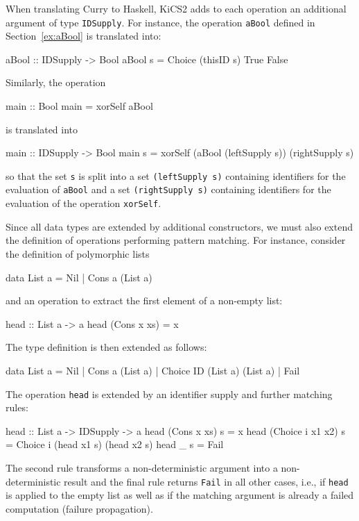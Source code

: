\documentclass{llncs}
\newcommand{\code}[1]{\mbox{\small\texttt{#1}}}
\begin{document}
When translating Curry to Haskell, KiCS2 adds to each operation
an additional argument of type \code{IDSupply}.
For instance, the operation \code{aBool}
defined in Section~\ref{ex:aBool} is translated into:
\begin{haskell}
  aBool :: IDSupply -> Bool
  aBool s = Choice (thisID s) True False
\end{haskell}
Similarly, the operation
\begin{curry}
  main :: Bool
  main = xorSelf aBool
\end{curry}
is translated into
\begin{haskell}
  main :: IDSupply -> Bool
  main s = xorSelf (aBool (leftSupply s)) (rightSupply s)
\end{haskell}
so that the set \code{s} is split into a set \code{(leftSupply s)}
containing identifiers for the evaluation of \code{aBool}
and a set \code{(rightSupply s)} containing identifiers
for the evaluation of the operation \code{xorSelf}.

Since all data types are extended by additional constructors,
we must also extend the definition of operations performing
pattern matching. For instance, consider the definition of polymorphic lists
\begin{curry}
  data List a = Nil | Cons a (List a)
\end{curry}
and an operation to extract the first element of a non-empty list:
\begin{curry}
  head :: List a -> a
  head (Cons x xs) = x
\end{curry}
The type definition is then extended as follows:
\begin{haskell}
  data List a = Nil | Cons a (List a) | Choice ID (List a) (List a) | Fail
\end{haskell}
The operation \code{head} is extended by an identifier supply
and further matching rules:
\begin{haskell}
  head :: List a -> IDSupply -> a
  head (Cons x xs)      s = x
  head (Choice i x1 x2) s = Choice i (head x1 s) (head x2 s)
  head _                s = Fail
\end{haskell}
The second rule transforms a non-deterministic argument
into a non-deterministic result and
the final rule returns \code{Fail} in all other cases,
i.e., if \code{head} is
applied to the empty list as well as if the matching argument
is already a failed computation (failure propagation).
\end{document}
